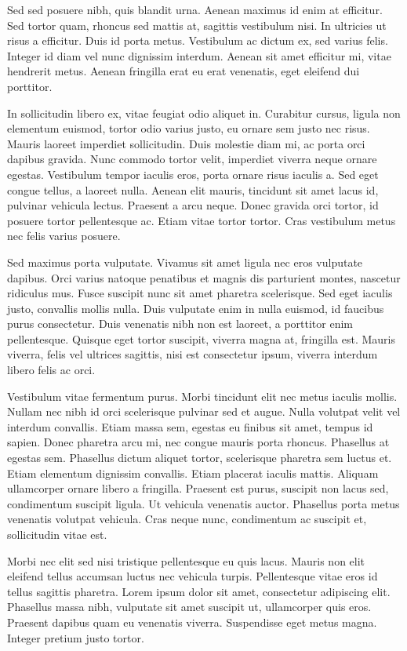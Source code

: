 Sed sed posuere nibh, quis blandit urna. Aenean maximus id enim at efficitur. Sed tortor quam, rhoncus sed mattis at, sagittis vestibulum nisi. In ultricies ut risus a efficitur. Duis id porta metus. Vestibulum ac dictum ex, sed varius felis. Integer id diam vel nunc dignissim interdum. Aenean sit amet efficitur mi, vitae hendrerit metus. Aenean fringilla erat eu erat venenatis, eget eleifend dui porttitor.

In sollicitudin libero ex, vitae feugiat odio aliquet in. Curabitur cursus, ligula non elementum euismod, tortor odio varius justo, eu ornare sem justo nec risus. Mauris laoreet imperdiet sollicitudin. Duis molestie diam mi, ac porta orci dapibus gravida. Nunc commodo tortor velit, imperdiet viverra neque ornare egestas. Vestibulum tempor iaculis eros, porta ornare risus iaculis a. Sed eget congue tellus, a laoreet nulla. Aenean elit mauris, tincidunt sit amet lacus id, pulvinar vehicula lectus. Praesent a arcu neque. Donec gravida orci tortor, id posuere tortor pellentesque ac. Etiam vitae tortor tortor. Cras vestibulum metus nec felis varius posuere.

Sed maximus porta vulputate. Vivamus sit amet ligula nec eros vulputate dapibus. Orci varius natoque penatibus et magnis dis parturient montes, nascetur ridiculus mus. Fusce suscipit nunc sit amet pharetra scelerisque. Sed eget iaculis justo, convallis mollis nulla. Duis vulputate enim in nulla euismod, id faucibus purus consectetur. Duis venenatis nibh non est laoreet, a porttitor enim pellentesque. Quisque eget tortor suscipit, viverra magna at, fringilla est. Mauris viverra, felis vel ultrices sagittis, nisi est consectetur ipsum, viverra interdum libero felis ac orci.

Vestibulum vitae fermentum purus. Morbi tincidunt elit nec metus iaculis mollis. Nullam nec nibh id orci scelerisque pulvinar sed et augue. Nulla volutpat velit vel interdum convallis. Etiam massa sem, egestas eu finibus sit amet, tempus id sapien. Donec pharetra arcu mi, nec congue mauris porta rhoncus. Phasellus at egestas sem. Phasellus dictum aliquet tortor, scelerisque pharetra sem luctus et. Etiam elementum dignissim convallis. Etiam placerat iaculis mattis. Aliquam ullamcorper ornare libero a fringilla. Praesent est purus, suscipit non lacus sed, condimentum suscipit ligula. Ut vehicula venenatis auctor. Phasellus porta metus venenatis volutpat vehicula. Cras neque nunc, condimentum ac suscipit et, sollicitudin vitae est.

Morbi nec elit sed nisi tristique pellentesque eu quis lacus. Mauris non elit eleifend tellus accumsan luctus nec vehicula turpis. Pellentesque vitae eros id tellus sagittis pharetra. Lorem ipsum dolor sit amet, consectetur adipiscing elit. Phasellus massa nibh, vulputate sit amet suscipit ut, ullamcorper quis eros. Praesent dapibus quam eu venenatis viverra. Suspendisse eget metus magna. Integer pretium justo tortor.

